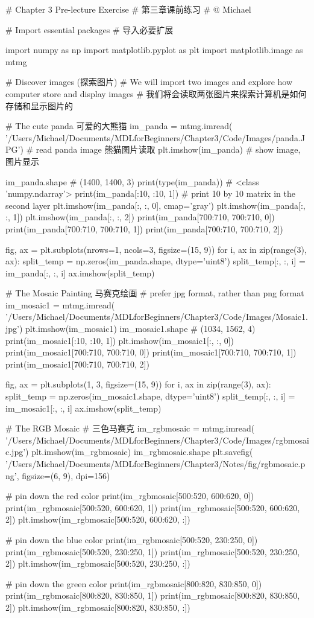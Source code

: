 \documentclass[12pt]{article}
\numberwithin{equation}{section}
\numberwithin{figure}{section}
\begin{document}
\begin{python}
# Chapter 3 Pre-lecture Exercise
# 第三章课前练习
# @ Michael

# Import essential packages
# 导入必要扩展

import numpy as np
import matplotlib.pyplot as plt
import matplotlib.image as mtmg

# Discover images (探索图片)
# We will import two images and explore how computer store and display images
# 我们将会读取两张图片来探索计算机是如何存储和显示图片的

# The cute panda 可爱的大熊猫
im_panda = mtmg.imread(
    '/Users/Michael/Documents/MDLforBeginners/Chapter3/Code/Images/panda.JPG')
# read panda image 熊猫图片读取
plt.imshow(im_panda)  # show image, 图片显示

im_panda.shape  # (1400, 1400, 3)
print(type(im_panda))   # <class 'numpy.ndarray'>
print(im_panda[:10, :10, 1])  # print 10 by 10 matrix in the second layer
plt.imshow(im_panda[:, :, 0], cmap='gray')
plt.imshow(im_panda[:, :, 1])
plt.imshow(im_panda[:, :, 2])
print(im_panda[700:710, 700:710, 0])
print(im_panda[700:710, 700:710, 1])
print(im_panda[700:710, 700:710, 2])

fig, ax = plt.subplots(nrows=1, ncols=3, figsize=(15, 9))
for i, ax in zip(range(3), ax):
    split_temp = np.zeros(im_panda.shape, dtype='uint8')
    split_temp[:, :, i] = im_panda[:, :, i]
    ax.imshow(split_temp)


# The Mosaic Painting 马赛克绘画
# prefer jpg format, rather than png format
im_mosaic1 = mtmg.imread(
    '/Users/Michael/Documents/MDLforBeginners/Chapter3/Code/Images/Mosaic1.jpg')
plt.imshow(im_mosaic1)
im_mosaic1.shape  # (1034, 1562, 4)
print(im_mosaic1[:10, :10, 1])
plt.imshow(im_mosaic1[:, :, 0])
print(im_mosaic1[700:710, 700:710, 0])
print(im_mosaic1[700:710, 700:710, 1])
print(im_mosaic1[700:710, 700:710, 2])

fig, ax = plt.subplots(1, 3, figsize=(15, 9))
for i, ax in zip(range(3), ax):
    split_temp = np.zeros(im_mosaic1.shape, dtype='uint8')
    split_temp[:, :, i] = im_mosaic1[:, :, i]
    ax.imshow(split_temp)


# The RGB Mosaic
# 三色马赛克
im_rgbmosaic = mtmg.imread(
    '/Users/Michael/Documents/MDLforBeginners/Chapter3/Code/Images/rgbmosaic.jpg')
plt.imshow(im_rgbmosaic)
im_rgbmosaic.shape
plt.savefig(
    '/Users/Michael/Documents/MDLforBeginners/Chapter3/Notes/fig/rgbmosaic.png',
    figsize=(6, 9), dpi=156)

# pin down the red color
print(im_rgbmosaic[500:520, 600:620, 0])
print(im_rgbmosaic[500:520, 600:620, 1])
print(im_rgbmosaic[500:520, 600:620, 2])
plt.imshow(im_rgbmosaic[500:520, 600:620, :])

# pin down the blue color
print(im_rgbmosaic[500:520, 230:250, 0])
print(im_rgbmosaic[500:520, 230:250, 1])
print(im_rgbmosaic[500:520, 230:250, 2])
plt.imshow(im_rgbmosaic[500:520, 230:250, :])

# pin down the green color
print(im_rgbmosaic[800:820, 830:850, 0])
print(im_rgbmosaic[800:820, 830:850, 1])
print(im_rgbmosaic[800:820, 830:850, 2])
plt.imshow(im_rgbmosaic[800:820, 830:850, :])	
\end{python}
\end{document}
